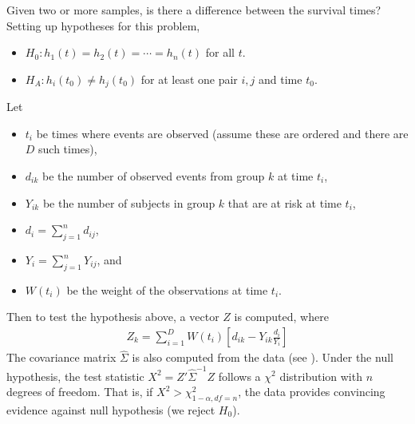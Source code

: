 \documentclass[11pt]{article}
\begin{document}
\pagebreak

{} \vspace{-1mm}\par
{}
\label{testsForTwoOrMoreSamples}

Given two or more samples, is there a difference between the survival times? Setting up hypotheses for this problem,
\begin{itemize}
\item $H_0: h_1(t) = h_2(t) = \cdots = h_n(t)$ for all $t$.
\item $H_A: h_i(t_0)\neq h_j(t_0)$ for at least one pair $i,j$ and time $t_0$.
\end{itemize}
Let
\begin{itemize}
\item $t_{i}$ be times where events are observed (assume these are ordered and there are $D$ such times),
\item $d_{ik}$ be the number of observed events from group $k$ at time $t_i$,
\item $Y_{ik}$ be the number of subjects in group $k$ that are at risk at time $t_i$,
\item $d_{i} = \sum_{j=1}^n d_{ij}$,
\item $Y_{i} = \sum_{j=1}^n Y_{ij}$, and
\item $W(t_i)$ be the weight of the observations at time $t_i$.
\end{itemize}
Then to test the hypothesis above, a vector $Z$ is computed, where
\begin{eqnarray*}
Z_k = \sum_{i=1}^D W(t_i)\left[d_{ik} - Y_{ik}\frac{d_{i}}{Y_{i}}\right]
\end{eqnarray*}
The covariance matrix $\widehat{\Sigma}$ is also computed from the data (see ). Under the null hypothesis, the test statistic $X^2 = Z'\hat{\Sigma}^{-1}Z$ follows a $\chi^2$ distribution with $n$ degrees of freedom. That is, if $X^2 > \chi^2_{1-\alpha, df=n}$, the data provides convincing evidence against null hypothesis (we reject $H_0$).
\end{document}
